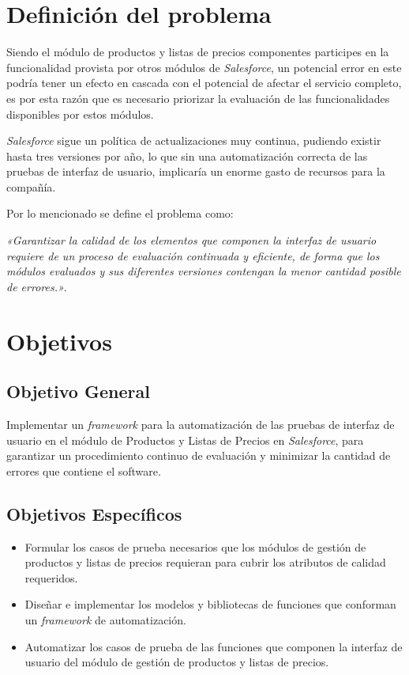 \section{Definición del problema}
Siendo el módulo de productos y listas de precios componentes participes en la
funcionalidad provista por otros módulos de \emph{Salesforce}, un potencial
error en este podría tener un efecto en cascada con el potencial de afectar el
servicio completo, es por esta razón que es necesario priorizar la evaluación
de las funcionalidades disponibles por estos módulos.

\emph{Salesforce} sigue un política de actualizaciones muy continua, pudiendo
existir hasta tres versiones por año, lo que sin una automatización correcta
de las pruebas de interfaz de usuario, implicaría un enorme gasto de recursos
para la compañía.

Por lo mencionado se define el problema como:

\emph{«Garantizar la calidad de los elementos que componen la interfaz de
usuario requiere de un proceso de evaluación continuada y eficiente, de forma
que los módulos evaluados y sus diferentes versiones contengan la menor
cantidad posible de errores.»}.

\section{Objetivos}

\subsection{Objetivo General}
Implementar un \emph{framework} para la automatización de las pruebas de interfaz de
usuario en el módulo de Productos y Listas de Precios en \emph{Salesforce},
para garantizar un procedimiento continuo de evaluación y minimizar la cantidad
de errores que contiene el software.

\subsection{Objetivos Específicos}
\begin{itemize}
\item Formular los casos de prueba necesarios que los módulos de gestión de
    productos y listas de precios requieran para cubrir los atributos de calidad
    requeridos.
\item Diseñar e implementar los modelos y bibliotecas de funciones que
    conforman un \emph{framework} de automatización.
\item Automatizar los casos de prueba de las funciones que componen la interfaz
    de usuario del módulo de gestión de productos y listas de precios.
\end{itemize}

